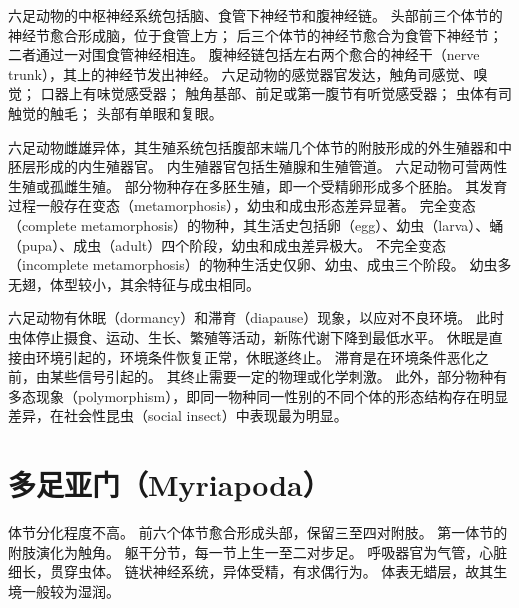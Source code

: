 \documentclass[11pt]{article}
\begin{document}
六足动物的中枢神经系统包括脑、食管下神经节和腹神经链。
头部前三个体节的神经节愈合形成脑，位于食管上方；
后三个体节的神经节愈合为食管下神经节；
二者通过一对围食管神经相连。
腹神经链包括左右两个愈合的神经干（nerve trunk），其上的神经节发出神经。
六足动物的感觉器官发达，触角司感觉、嗅觉；
口器上有味觉感受器；
触角基部、前足或第一腹节有听觉感受器；
虫体有司触觉的触毛；
头部有单眼和复眼。

\newline

六足动物雌雄异体，其生殖系统包括腹部末端几个体节的附肢形成的外生殖器和中胚层形成的内生殖器官。
内生殖器官包括生殖腺和生殖管道。
六足动物可营两性生殖或孤雌生殖。
部分物种存在多胚生殖，即一个受精卵形成多个胚胎。
其发育过程一般存在变态（metamorphosis），幼虫和成虫形态差异显著。
完全变态（complete metamorphosis）的物种，其生活史包括卵（egg）、幼虫（larva）、蛹（pupa）、成虫（adult）四个阶段，幼虫和成虫差异极大。
不完全变态（incomplete metamorphosis）的物种生活史仅卵、幼虫、成虫三个阶段。
幼虫多无翅，体型较小，其余特征与成虫相同。

\newline

六足动物有休眠（dormancy）和滞育（diapause）现象，以应对不良环境。
此时虫体停止摄食、运动、生长、繁殖等活动，新陈代谢下降到最低水平。
休眠是直接由环境引起的，环境条件恢复正常，休眠遂终止。
滞育是在环境条件恶化之前，由某些信号引起的。
其终止需要一定的物理或化学刺激。
此外，部分物种有多态现象（polymorphism），即同一物种同一性别的不同个体的形态结构存在明显差异，在社会性昆虫（social insect）中表现最为明显。

\section{多足亚门（Myriapoda）}
体节分化程度不高。
前六个体节愈合形成头部，保留三至四对附肢。
第一体节的附肢演化为触角。
躯干分节，每一节上生一至二对步足。
呼吸器官为气管，心脏细长，贯穿虫体。
链状神经系统，异体受精，有求偶行为。
体表无蜡层，故其生境一般较为湿润。
\end{document}
